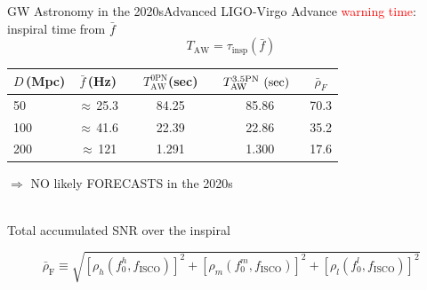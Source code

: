 \documentclass[xcolor=dvipsnames,t]{beamer}
\newcommand{\red}[1]{\textcolor{red}{#1}}
\newcommand\T{\rule{0pt}{2.6ex}}       %
\newcommand\B{\rule[-1.2ex]{0pt}{0pt}} %
\begin{document}
\begin{frame}{GW Astronomy in the 2020s}{Advanced LIGO-Virgo}
  Advance \red{warning time}: inspiral time from $\bar{f}$
  \[
    T_\text{AW} = \tau_\text{insp}(\bar{f})
  \]
  \begin{footnotesize}
         \begin{table}[h]
	\centering
	\begin{tabular}{lcccccc}
	  \hline\hline
	  $D\,$(Mpc) & $\bar{f}\,$(Hz) &{}& $T^\text{0PN}_\text{AW}$(sec) &\hspace{1mm} & $T^\text{3.5PN}_\text{AW}\text{ (sec)}\hspace{2mm}$& $\bar{\rho}_F$\T \B \\
	  \hline
	  50 & $\approx\,$25.3 & & 84.25 & & 85.86 & 70.3 \\
	  100 & $\approx\,$41.6 & & 22.39 & & 22.86 & 35.2 \\
	  200 & $\approx\,$121 & & 1.291 &\quad & 1.300 & 17.6 \\
	  \hline\hline
	\end{tabular}
      \end{table}
  \end{footnotesize}
  $\Longrightarrow$ NO likely FORECASTS  in the 2020s
  \\
  \vspace{2mm}
      Total accumulated SNR over the inspiral
    \begin{footnotesize}
      \[
      \bar{\rho}_\text{F}\equiv\sqrt{\left[{\rho}_h(f_0^h,{f}_\text{ISCO})\right]^2+\left[{\rho}_m(f_0^m,{f}_\text{ISCO})\right]^2+\left[{\rho}_l(f_0^l,{f}_\text{ISCO})\right]^2}
      \]
    \end{footnotesize}
\end{frame}
\end{document}
